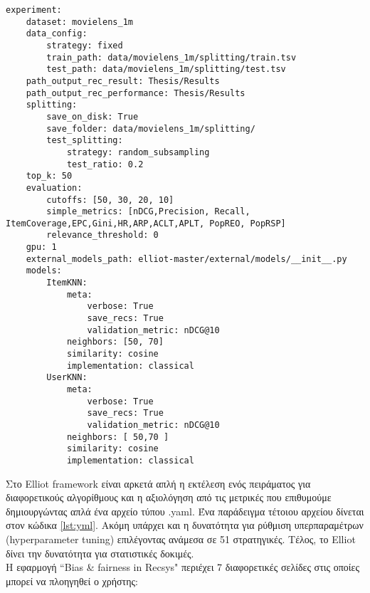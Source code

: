 \begin{lstlisting}[caption={Παράδειγμα yaml αρχείου στο Elliot},label={lst:yml},style=mystyle]
experiment:
	dataset: movielens_1m
	data_config:
		strategy: fixed
		train_path: data/movielens_1m/splitting/train.tsv
		test_path: data/movielens_1m/splitting/test.tsv
	path_output_rec_result: Thesis/Results
	path_output_rec_performance: Thesis/Results
	splitting:
		save_on_disk: True
		save_folder: data/movielens_1m/splitting/
		test_splitting:
			strategy: random_subsampling
			test_ratio: 0.2
	top_k: 50
	evaluation:
		cutoffs: [50, 30, 20, 10]
		simple_metrics: [nDCG,Precision, Recall, ItemCoverage,EPC,Gini,HR,ARP,ACLT,APLT, PopREO, PopRSP]
		relevance_threshold: 0
	gpu: 1
	external_models_path: elliot-master/external/models/__init__.py
	models:
		ItemKNN:
			meta:
				verbose: True
				save_recs: True
				validation_metric: nDCG@10
			neighbors: [50, 70]
			similarity: cosine
			implementation: classical
		UserKNN:
			meta:
				verbose: True
				save_recs: True
				validation_metric: nDCG@10
			neighbors: [ 50,70 ]
			similarity: cosine
			implementation: classical
\end{lstlisting}

\noindent Στο Elliot framework είναι αρκετά απλή η εκτέλεση ενός πειράματος για διαφορετικούς αλγορίθμους και η αξιολόγηση από τις μετρικές που επιθυμούμε δημιουργώντας απλά ένα αρχείο τύπου .yaml. Ένα παράδειγμα τέτοιου αρχείου δίνεται στον κώδικα \ref{lst:yml}.
 Ακόμη υπάρχει και η δυνατότητα για ρύθμιση υπερπαραμέτρων (hyperparameter tuning) επιλέγοντας ανάμεσα σε 51 στρατηγικές. Τέλος, το Elliot δίνει την δυνατότητα για στατιστικές δοκιμές.\\
Η εφαρμογή ``Bias \& fairness in Recsys" περιέχει 7 διαφορετικές σελίδες στις οποίες μπορεί να πλοηγηθεί ο χρήστης:

